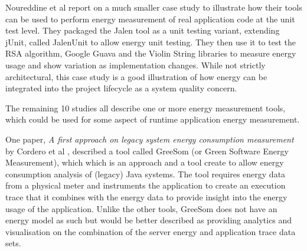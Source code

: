 Noureddine et al report on a much smaller case study to illustrate how their tools can be used to perform energy measurement of real application code at the unit test level.  They packaged the Jalen tool as a unit testing variant, extending jUnit, called JalenUnit to allow energy unit testing.  They then use it to test the RSA algorithm, Google Guava and the Violin String libraries to measure energy usage and show variation as implementation changes.  While not strictly architectural, this case study is a good illustration of how energy can be integrated into the project lifecycle as a system quality concern.

The remaining 10 studies all describe one or more energy measurement tools, which could be used for some aspect of runtime application energy measurement.

One paper, \emph{A first approach on legacy system energy consumption measurement} by Cordero et al \cite{cordero2015-legacyenergy}, described a tool called GreeSom (or Green Software Energy Measurement), which which is an approach and a tool create to allow energy consumption analysis of (legacy) Java systems.  The tool requires energy data from a physical meter and instruments the application to create an execution trace that it combines with the energy data to provide insight into the energy usage of the application.  Unlike the other tools, GreeSom does not have an energy model as such but would be better described as providing analytics and visualisation on the combination of the server energy and application trace data sets. 


